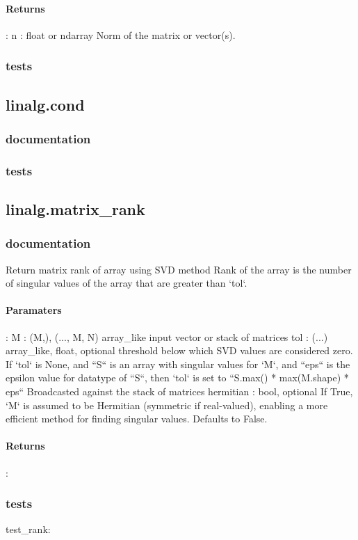 \documentclass[a4paper,11pt]{article}
\begin{document}
\paragraph{Returns}:    
n : float or ndarray
Norm of the matrix or vector(s).\\

\subsubsection{tests}
\subsection{linalg.cond}
\subsubsection{documentation}
\subsubsection{tests}


\subsection{linalg.matrix\_rank}
\subsubsection{documentation}
Return matrix rank of array using SVD method
Rank of the array is the number of singular values of the array that are
greater than `tol`.
\paragraph{Paramaters}:  M : {(M,), (..., M, N)} array\_like input vector or stack of matrices
tol : (...) array\_like, float, optional
threshold below which SVD values are considered zero. If `tol` is None, and ``S`` is an array with singular values for `M`, and ``eps`` is the epsilon value for datatype of ``S``, then `tol` is set to ``S.max() * max(M.shape) * eps`` Broadcasted against the stack of matrices hermitian : bool, optional If True, `M` is assumed to be Hermitian (symmetric if real-valued),
enabling a more efficient method for finding singular values. Defaults to False.
\paragraph{Returns}: 
\subsubsection{tests}
test\_rank:  
\end{document}
